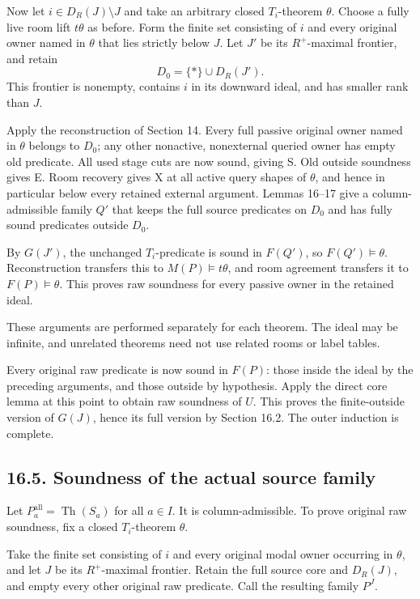 \documentclass[
  11pt,
  letterpaper,
]{article}
\begin{document}
Now let \(i\in D_R(J)\setminus J\) and take an arbitrary closed
\(T_i\)-theorem \(\theta\). Choose a fully live room lift \(t\theta\) as
before. Form the finite set consisting of \(i\) and every original owner
named in \(\theta\) that lies strictly below \(J\). Let \(J'\) be its
\(R^+\)-maximal frontier, and retain \[
D_0=\{*\}\cup D_R(J').
\] This frontier is nonempty, contains \(i\) in its downward ideal, and
has smaller rank than \(J\).

Apply the reconstruction of Section 14. Every full passive original
owner named in \(\theta\) belongs to \(D_0\); any other nonactive,
nonexternal queried owner has empty old predicate. All used stage cuts
are now sound, giving S. Old outside soundness gives E. Room recovery
gives X at all active query shapes of \(\theta\), and hence in
particular below every retained external argument. Lemmas 16--17 give a
column-admissible family \(Q'\) that keeps the full source predicates on
\(D_0\) and has fully sound predicates outside \(D_0\).

By \(G(J')\), the unchanged \(T_i\)-predicate is sound in \(F(Q')\), so
\(F(Q')\models\theta\). Reconstruction transfers this to
\(M(P)\models t\theta\), and room agreement transfers it to
\(F(P)\models\theta\). This proves raw soundness for every passive owner
in the retained ideal.

These arguments are performed separately for each theorem. The ideal may
be infinite, and unrelated theorems need not use related rooms or label
tables.

Every original raw predicate is now sound in \(F(P)\): those inside the
ideal by the preceding arguments, and those outside by hypothesis. Apply
the direct core lemma at this point to obtain raw soundness of \(U\).
This proves the finite-outside version of \(G(J)\), hence its full
version by Section 16.2. The outer induction is complete.

\subsection{16.5. Soundness of the actual source
family}\label{soundness-of-the-actual-source-family}

Let \(P^{\mathrm{all}}_a=\operatorname{Th}(S_a)\) for all \(a\in I\). It
is column-admissible. To prove original raw soundness, fix a closed
\(T_i\)-theorem \(\theta\).

Take the finite set consisting of \(i\) and every original modal owner
occurring in \(\theta\), and let \(J\) be its \(R^+\)-maximal frontier.
Retain the full source core and \(D_R(J)\), and empty every other
original raw predicate. Call the resulting family \(P^J\).
\end{document}
